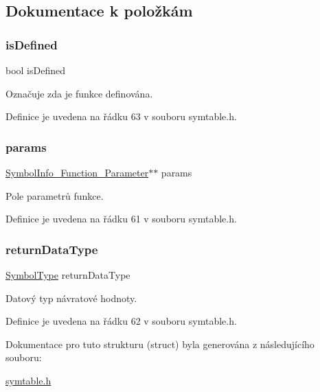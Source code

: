 \subsection{Dokumentace k položkám}
\mbox{\label{struct_s___symbol_info___function_a8d55fb364b94ff0817d5b981f08ad26b}} 
\subsubsection{\texorpdfstring{is\+Defined}{isDefined}}
{\footnotesize\ttfamily bool is\+Defined}



Označuje zda je funkce definována. 



Definice je uvedena na řádku 63 v souboru symtable.\+h.

\mbox{\label{struct_s___symbol_info___function_a523efb68a2dc227e238af5fc1e1e38e0}} 
\subsubsection{\texorpdfstring{params}{params}}
{\footnotesize\ttfamily \hyperlink{symtable_8h_a6f66814120a40ef33089435deec15f47}{Symbol\+Info\+\_\+\+Function\+\_\+\+Parameter}$\ast$$\ast$ params}



Pole parametrů funkce. 



Definice je uvedena na řádku 61 v souboru symtable.\+h.

\mbox{\label{struct_s___symbol_info___function_a4ce26a8194ccedd60da46576f0fb9453}} 
\subsubsection{\texorpdfstring{return\+Data\+Type}{returnDataType}}
{\footnotesize\ttfamily \hyperlink{symtable_8h_a623952f6aa67a355a3840e25272b1c91}{Symbol\+Type} return\+Data\+Type}



Datový typ návratové hodnoty. 



Definice je uvedena na řádku 62 v souboru symtable.\+h.



Dokumentace pro tuto strukturu (struct) byla generována z následujícího souboru\+:\begin{DoxyCompactItemize}
\item 
\hyperlink{symtable_8h}{symtable.\+h}\end{DoxyCompactItemize}

